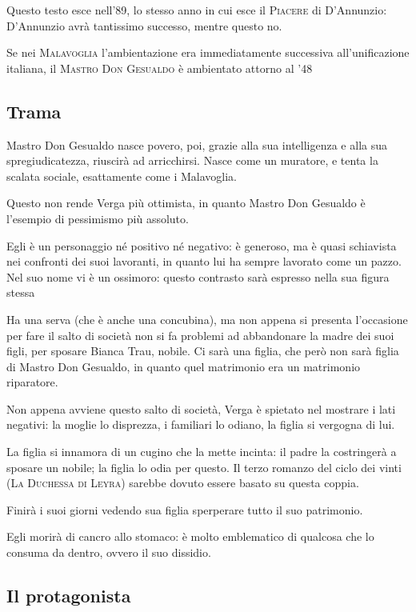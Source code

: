 \documentclass{book}
\begin{document}
Questo testo esce nell'89, lo stesso anno in cui esce il \textsc{Piacere}
di D'Annunzio: D'Annunzio avrà tantissimo successo, mentre questo no.

Se nei \textsc{Malavoglia} l'ambientazione era immediatamente successiva
all'unificazione italiana, il \textsc{Mastro Don Gesualdo} è ambientato
attorno al '48

\subsection{Trama}

Mastro Don Gesualdo nasce povero, poi, grazie alla sua intelligenza e
alla sua spregiudicatezza, riuscirà ad arricchirsi. Nasce come un
muratore, e tenta la scalata sociale, esattamente come i Malavoglia.

Questo non rende Verga più ottimista, in quanto Mastro Don Gesualdo è
l'esempio di pessimismo più assoluto.

Egli è un personaggio né positivo né negativo: è generoso, ma è quasi
schiavista nei confronti dei suoi lavoranti, in quanto lui ha sempre
lavorato come un pazzo. Nel suo nome vi è un ossimoro: questo contrasto
sarà espresso nella sua figura stessa

Ha una serva (che è anche una concubina), ma non appena si presenta
l'occasione per fare il salto di società non si fa problemi ad
abbandonare la madre dei suoi figli, per sposare Bianca Trau, nobile. Ci
sarà una figlia, che però non sarà figlia di Mastro Don Gesualdo, in
quanto quel matrimonio era un matrimonio riparatore.

Non appena avviene questo salto di società, Verga è spietato nel
mostrare i lati negativi: la moglie lo disprezza, i familiari lo odiano,
la figlia si vergogna di lui.

La figlia si innamora di un cugino che la mette incinta: il padre la
costringerà a sposare un nobile; la figlia lo odia per questo. Il terzo
romanzo del ciclo dei vinti (\textsc{La Duchessa di Leyra}) sarebbe dovuto
essere basato su questa coppia.

Finirà i suoi giorni vedendo sua figlia sperperare tutto il suo
patrimonio.

Egli morirà di cancro allo stomaco: è molto emblematico di qualcosa che
lo consuma da dentro, ovvero il suo dissidio.

\subsection{Il protagonista}
\end{document}
